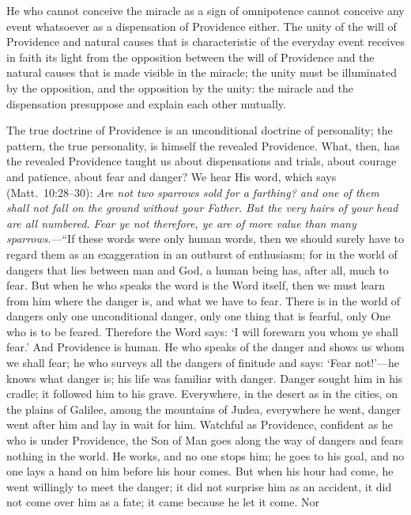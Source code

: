 \documentclass[12pt]{book}
\newcommand{\opage}[1]{\marginnote{\footnotesize\textit{[#1]}}}
\begin{document}
He who cannot conceive the miracle as a sign of omnipotence cannot
conceive any event whatsoever as a dispensation of Providence either.
The unity of the will of Providence and natural causes that is
characteristic of the everyday event receives in faith its light from
the opposition between the will of Providence and the natural causes
that is made visible in the miracle; the unity must be illuminated by
the opposition, and the opposition by the unity: the miracle and the
dispensation presuppose and explain each other mutually.

The true doctrine of Providence is an unconditional doctrine of
personality; the pattern, the true personality, is himself the revealed
Providence. What, then, has the revealed Providence taught us about
dispensations and trials, about courage and patience, about fear and
danger? We hear His word, which says (Matt.~10:28--30): \emph{Are not two
sparrows sold for a farthing? and one of them shall not fall on the
ground without your Father. But the very hairs of your head are all
numbered. Fear ye not therefore, ye are of more value than many
sparrows}.---``If these words were only human words, then we should
surely have to regard them as an exaggeration in an outburst of
enthusiasm; for in the world of dangers that lies between man and God, a
human being has, after all, much to fear.
\opage{223}\setcounter{footnote}{0}%
But when he who speaks the word is the Word itself, then we must learn
from him where the danger is, and what we have to fear. There is in the
world of dangers only one unconditional danger, only one thing that is
fearful, only One who is to be feared. Therefore the Word says: `I will
forewarn you whom ye shall fear.' And Providence is human. He who
speaks of the danger and shows us whom we shall fear; he who surveys all
the dangers of finitude and says: `Fear not!'---he knows what danger
is; his life was familiar with danger. Danger sought him in his cradle;
it followed him to his grave. Everywhere, in the desert as in the
cities, on the plains of Galilee, among the mountains of Judea,
everywhere he went, danger went after him and lay in wait for him.
Watchful as Providence, confident as he who is under Providence, the Son
of Man goes along the way of dangers and fears nothing in the world. He
works, and no one stops him; he goes to his goal, and no one lays a hand
on him before his hour comes. But when his hour had come, he went
willingly to meet the danger; it did not surprise him as an accident, it
did not come over him as a fate; it came because he let it come. Nor
\end{document}
